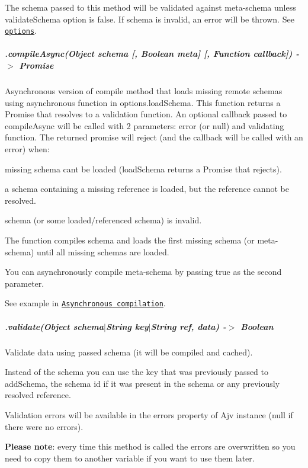 The schema passed to this method will be validated against meta-\/schema unless {\ttfamily validate\+Schema} option is false. If schema is invalid, an error will be thrown. See \href{#options}{\tt options}.

\subparagraph*{\label{_api-compileAsync}%
.compile\+Async(\+Object schema \mbox{[}, Boolean meta\mbox{]} \mbox{[}, Function callback\mbox{]}) -\/$>$ Promise}

Asynchronous version of {\ttfamily compile} method that loads missing remote schemas using asynchronous function in {\ttfamily options.\+load\+Schema}. This function returns a Promise that resolves to a validation function. An optional callback passed to {\ttfamily compile\+Async} will be called with 2 parameters\+: error (or null) and validating function. The returned promise will reject (and the callback will be called with an error) when\+:


\begin{DoxyItemize}
\item missing schema can\textquotesingle{}t be loaded ({\ttfamily load\+Schema} returns a Promise that rejects).
\item a schema containing a missing reference is loaded, but the reference cannot be resolved.
\item schema (or some loaded/referenced schema) is invalid.
\end{DoxyItemize}

The function compiles schema and loads the first missing schema (or meta-\/schema) until all missing schemas are loaded.

You can asynchronously compile meta-\/schema by passing {\ttfamily true} as the second parameter.

See example in \href{#asynchronous-schema-compilation}{\tt Asynchronous compilation}.

\subparagraph*{.validate(Object schema$\vert$\+String key$\vert$\+String ref, data) -\/$>$ Boolean}

Validate data using passed schema (it will be compiled and cached).

Instead of the schema you can use the key that was previously passed to {\ttfamily add\+Schema}, the schema id if it was present in the schema or any previously resolved reference.

Validation errors will be available in the {\ttfamily errors} property of Ajv instance ({\ttfamily null} if there were no errors).

{\bfseries Please note}\+: every time this method is called the errors are overwritten so you need to copy them to another variable if you want to use them later.

